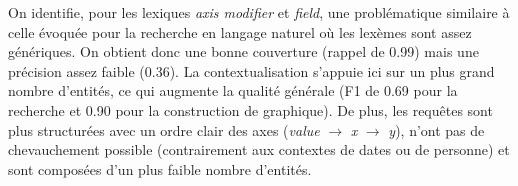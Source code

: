 On identifie, pour les lexiques \emph{axis modifier} et \emph{field}, une problématique similaire à celle évoquée pour la recherche en langage naturel où les lexèmes sont assez génériques.
On obtient donc une bonne couverture (rappel de \num{0,99}) mais une précision assez faible (\num{0,36}).
La contextualisation s'appuie ici sur un plus grand nombre d'entités, ce qui augmente la qualité générale (F1 de \num{0,69} pour la recherche et \num{0,90} pour la construction de graphique).
De plus, les requêtes sont plus structurées avec un ordre clair des axes (\emph{value} $\to$ \emph{x} $\to$ \emph{y}), n'ont pas de chevauchement possible (contrairement aux contextes de dates ou de personne) et sont composées d'un plus faible nombre d'entités.

\FloatBarrier
